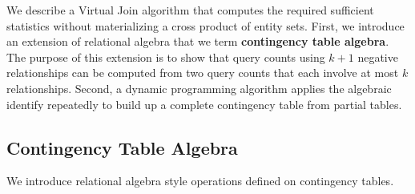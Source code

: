 \documentclass{sig-alternate-2013}
\newcommand{\ct}{\mathit{ct}}
\begin{document}
We describe a Virtual Join algorithm that computes the required sufficient statistics without  materializing a cross product of entity sets. 
First, we introduce an  extension of relational algebra that we term \textbf{contingency table algebra}. The purpose of this extension is to 
show that query counts using $k+1$ negative relationships can be computed from two query counts that each involve at most $k$ relationships. 
Second, a dynamic programming algorithm applies the algebraic identify repeatedly to build up a complete contingency table from partial tables.


\subsection{Contingency Table Algebra} \label{sec:cta}
We introduce relational algebra style operations defined on contingency tables.

\end{document}
